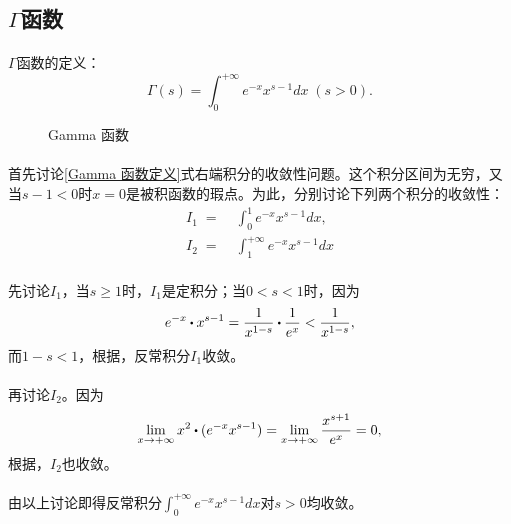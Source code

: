 \subsection[Γ函数]{$\Gamma$函数}
\paragraph{}
$\Gamma$函数的定义：
\begin{equation}
  \label{Gamma 函数定义}
  \Gamma(s) = \int_0^{+\infty}e^{-x}x^{s-1}dx \; (s > 0).
\end{equation}

\begin{figure}[H]
\centering
  
  \caption{Gamma 函数}
  \label{Gamma 函数}
\end{figure}

\paragraph{}
首先讨论\eqref{Gamma 函数定义}式右端积分的收敛性问题。这个积分区间为无穷，又当$s-1<0$时$x=0$是被积函数的瑕点。为此，分别讨论下列两个积分的收敛性：
\begin{align*}
  I_1 \;=&\; \int_0^1e^{-x}x^{s-1}dx, \\
  I_2 \;=&\; \int_1^{+\infty}e^{-x}x^{s-1}dx
\end{align*}

\paragraph{}
先讨论$I_1$，当$s \geq 1$时，$I_1$是定积分；当$0 < s < 1$时，因为
\begin{equation}
  e^{-x} \bigcdot x^{s-1} = \frac{1}{x^{1-s}} \bigcdot \frac{1}{e^x} < \frac{1}{x^{1-s}},
\end{equation}
而$1-s < 1$，根据，反常积分$I_1$收敛。

\paragraph{}
再讨论$I_2$。因为
\begin{equation}
  \lim_{x \to +\infty}x^2 \bigcdot (e^{-x}x^{s-1}) = \lim_{x \to +\infty}\frac{x^{s+1}}{e^x} = 0,
\end{equation}
根据，$I_2$也收敛。

\paragraph{}
由以上讨论即得反常积分$\displaystyle\int_0^{+\infty}e^{-x}x^{s-1}dx$对$s>0$均收敛。

